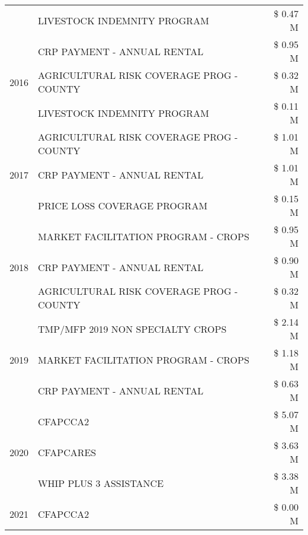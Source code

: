 \begin{tabular}{llr}
 & LIVESTOCK INDEMNITY PROGRAM & \$ 0.47 M \\
\cline{1-3}
\multirow[t]{3}{*}{2016} & CRP PAYMENT - ANNUAL RENTAL & \$ 0.95 M \\
 & AGRICULTURAL RISK COVERAGE PROG - COUNTY & \$ 0.32 M \\
 & LIVESTOCK INDEMNITY PROGRAM & \$ 0.11 M \\
\cline{1-3}
\multirow[t]{3}{*}{2017} & AGRICULTURAL RISK COVERAGE PROG - COUNTY & \$ 1.01 M \\
 & CRP PAYMENT - ANNUAL RENTAL & \$ 1.01 M \\
 & PRICE LOSS COVERAGE PROGRAM & \$ 0.15 M \\
\cline{1-3}
\multirow[t]{3}{*}{2018} & MARKET FACILITATION PROGRAM - CROPS & \$ 0.95 M \\
 & CRP PAYMENT - ANNUAL RENTAL & \$ 0.90 M \\
 & AGRICULTURAL RISK COVERAGE PROG - COUNTY & \$ 0.32 M \\
\cline{1-3}
\multirow[t]{3}{*}{2019} & TMP/MFP 2019 NON SPECIALTY CROPS & \$ 2.14 M \\
 & MARKET FACILITATION PROGRAM - CROPS & \$ 1.18 M \\
 & CRP PAYMENT - ANNUAL RENTAL & \$ 0.63 M \\
\cline{1-3}
\multirow[t]{3}{*}{2020} & CFAPCCA2 & \$ 5.07 M \\
 & CFAPCARES & \$ 3.63 M \\
 & WHIP PLUS 3 ASSISTANCE & \$ 3.38 M \\
\cline{1-3}
2021 & CFAPCCA2 & \$ 0.00 M \\
\cline{1-3}
\bottomrule
\end{tabular}
